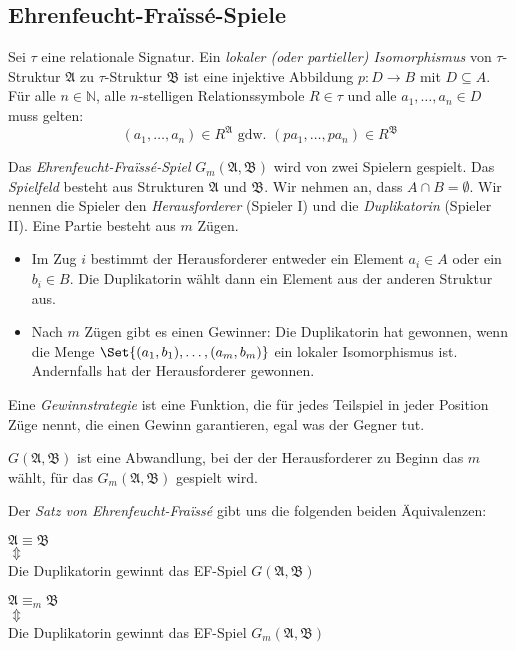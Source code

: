 \documentclass{panikzettel}
\newcommand{\A}{\mathfrak{A}}
\newcommand{\B}{\mathfrak{B}}
\begin{document}
\subsection{Ehrenfeucht-Fra\"issé-Spiele}

Sei $\tau$ eine relationale Signatur. Ein \emph{lokaler (oder partieller) Isomorphismus} von $\tau$-Struktur $\A$ zu $\tau$-Struktur $\B$ ist eine injektive Abbildung $p : D \to B$ mit $D \subseteq A$. Für alle $n \in \mathbb{N}$, alle $n$-stelligen Relationssymbole $R \in \tau$ und alle $a_1, \ldots, a_n \in D$ muss gelten:
\[ (a_1, \ldots, a_n) \in R^\A \text{ gdw. } (p a_1, \ldots, p a_n) \in R^\B \]

Das \emph{Ehrenfeucht-Fra\"issé-Spiel} $G_m(\A, \B)$ wird von zwei Spielern gespielt. Das \emph{Spielfeld} besteht aus Strukturen $\A$ und $\B$. Wir nehmen an, dass $A \cap B = \emptyset$. Wir nennen die Spieler den \emph{Herausforderer} (Spieler I) und die \emph{Duplikatorin} (Spieler II). Eine Partie besteht aus $m$ Zügen.

\begin{itemize}
  \item Im Zug $i$ bestimmt der Herausforderer entweder ein Element $a_i \in A$ oder ein $b_i \in B$. Die Duplikatorin wählt dann ein Element aus der anderen Struktur aus.
  \item Nach $m$ Zügen gibt es einen Gewinner: Die Duplikatorin hat gewonnen, wenn die Menge $\Set{(a_1, b_1), \ldots,  (a_m, b_m)}$ ein lokaler Isomorphismus ist. Andernfalls hat der Herausforderer gewonnen.
\end{itemize}

Eine \emph{Gewinnstrategie} ist eine Funktion, die für jedes Teilspiel in jeder Position Züge nennt, die einen Gewinn garantieren, egal was der Gegner tut.

$G(\A, \B)$ ist eine Abwandlung, bei der der Herausforderer zu Beginn das $m$ wählt, für das $G_m(\A, \B)$ gespielt wird.

Der \emph{Satz von Ehrenfeucht-Fra\"issé} gibt uns die folgenden beiden Äquivalenzen:

\begin{center}
\begin{minipage}{0.3\textwidth}
\centering
$\A \equiv \B$ \\
$\Updownarrow$ \\
Die Duplikatorin gewinnt das EF-Spiel $G(\A, \B)$
\end{minipage}\hspace{0.1\textwidth}
\begin{minipage}{0.3\textwidth}
\centering
$\A \equiv_m \B$ \\
$\Updownarrow$ \\
Die Duplikatorin gewinnt das EF-Spiel $G_m(\A, \B)$
\end{minipage}
\end{center}
\end{document}

